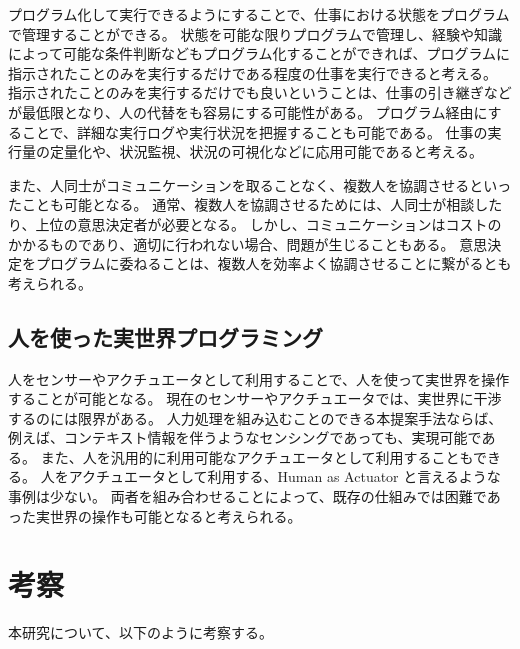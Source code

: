 \documentclass[twoside]{wiss}
\begin{document}
プログラム化して実行できるようにすることで、仕事における状態をプログラムで管理することができる。
状態を可能な限りプログラムで管理し、経験や知識によって可能な条件判断などもプログラム化することができれば、プログラムに指示されたことのみを実行するだけである程度の仕事を実行できると考える。
指示されたことのみを実行するだけでも良いということは、仕事の引き継ぎなどが最低限となり、人の代替をも容易にする可能性がある。
プログラム経由にすることで、詳細な実行ログや実行状況を把握することも可能である。
仕事の実行量の定量化や、状況監視、状況の可視化などに応用可能であると考える。

また、人同士がコミュニケーションを取ることなく、複数人を協調させるといったことも可能となる。
通常、複数人を協調させるためには、人同士が相談したり、上位の意思決定者が必要となる。
しかし、コミュニケーションはコストのかかるものであり、適切に行われない場合、問題が生じることもある。
意思決定をプログラムに委ねることは、複数人を効率よく協調させることに繋がるとも考えられる。


\subsection{人を使った実世界プログラミング}

人をセンサーやアクチュエータとして利用することで、人を使って実世界を操作することが可能となる。
現在のセンサーやアクチュエータでは、実世界に干渉するのには限界がある。
人力処理を組み込むことのできる本提案手法ならば、例えば、コンテキスト情報を伴うようなセンシングであっても、実現可能である。
また、人を汎用的に利用可能なアクチュエータとして利用することもできる。
人をアクチュエータとして利用する、Human as Actuator と言えるような事例は少ない。
両者を組み合わせることによって、既存の仕組みでは困難であった実世界の操作も可能となると考えられる。



\section{考察}

本研究について、以下のように考察する。
\end{document}

